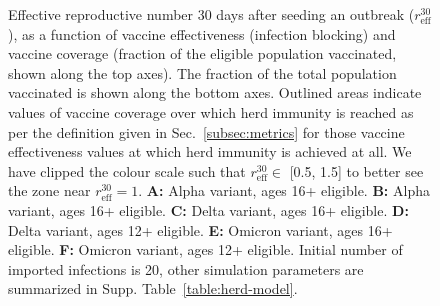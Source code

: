\documentclass[article, a4, authoryear]{elsarticle}
\begin{document}
\begin{figure}[H]
    \centering
    \hfill
    \hfill
    \hfill
    \hfill
    \hfill
    \hfill
    \caption{Effective reproductive number 30 days after seeding an outbreak ($r^{30}_\mathrm{eff}$), as a function of vaccine effectiveness (infection blocking) and vaccine coverage (fraction of the eligible population vaccinated, shown along the top axes). The fraction of the total population vaccinated is shown along the bottom axes. Outlined areas indicate values of vaccine coverage over which herd immunity is reached as per the definition given in Sec.~\ref{subsec:metrics} for those vaccine effectiveness values at which herd immunity is achieved at all. We have clipped the colour scale such that $r^{30}_\mathrm{eff} \in$ [0.5, 1.5] to better see the zone near $r^{30}_\mathrm{eff}=1$. \textbf{A:} Alpha variant, ages 16+ eligible. \textbf{B:} Alpha variant, ages 16+ eligible. \textbf{C:} Delta variant, ages 16+ eligible. \textbf{D:} Delta variant, ages 12+ eligible. \textbf{E:} Omicron variant, ages 16+ eligible. \textbf{F:} Omicron variant, ages 12+ eligible.
    Initial number of imported infections is 20, other simulation parameters are summarized in Supp. Table~\ref{table:herd-model}.}
    \label{fig:heatmap_plot_reff}
\end{figure}
\end{document}
